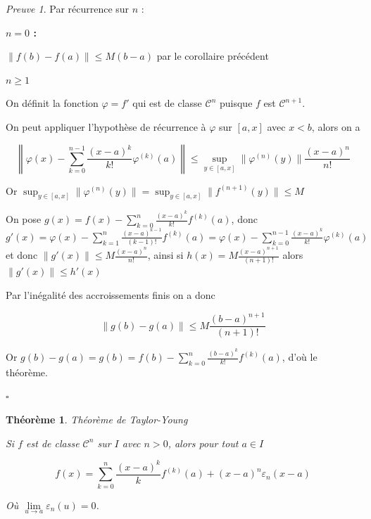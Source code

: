 \documentclass[]{article}
\newtheorem{mythm}{Théorème}
\theoremstyle{remark}
\newtheorem{myproof}{Preuve}
\theoremstyle{definition}
\newcommand{\cqfd}{
	\hfill$\square$
}
\newenvironment{proofpart}[1]{
	\noindent
	{\textbf{\boldmath #1}}
}{
	\checkmark
}
\begin{document}
\begin{myproof}
	Par récurrence sur $n$ :
	
	\begin{proofpart}{$n = 0$ :}
		$\|f(b) - f(a)\| \leqslant M (b - a)$ par le corollaire précédent
	\end{proofpart}
	
	\begin{proofpart}{$ n \geqslant 1$}
		On définit la fonction $\varphi = f'$ qui est de classe $\mathcal{C}^n$ puisque $f$ est $\mathcal{C}^{n+1}$.
		
		On peut appliquer l'hypothèse de récurrence à $\varphi$ sur $[a, x]$ avec $x < b$, alors on a
		
		$$\left\|\varphi(x) - \sum_{k = 0}^{n - 1} \frac{(x - a)^k}{k!} \varphi^{(k)}(a)\right\| \leqslant \sup_{y \in [a, x]} \|\varphi^{(n)}(y)\| \frac{(x-a)^n}{n!}$$
		
		Or $\displaystyle \sup_{y \in [a, x]} \|\varphi^{(n)}(y)\| = \sup_{y \in [a, x]} \|f^{(n+1)}(y)\| \leqslant M$
		
		On pose $g(x) = f(x) - \sum_{k = 0}^{n} \frac{(x-a)^k}{k!}f^{(k)}(a)$, donc $g'(x) = \varphi(x) - \sum_{k = 1}^{n} \frac{(x-a)^{k-1}}{(k-1)!}f^{(k)}(a) = \varphi(x) - \sum_{k = 0}^{n-1} \frac{(x-a)^k}{k!}\varphi^{(k)}(a)$ et donc $\|g'(x)\| \leqslant M \frac{(x-a)^n}{n!}$, ainsi si $h(x)= M \frac{(x-a)^{n+1}}{(n+1)!}$ alors $\|g'(x)\| \leqslant h'(x)$
		
		Par l'inégalité des accroissements finis on a donc
		
		$$\|g(b) - g(a)\| \leqslant M \frac{(b-a)^{n+1}}{(n+1)!}$$
		
		Or $\displaystyle g(b) - g(a) = g(b) = f(b) - \sum_{k= 0}^{n} \frac{(b-a)^k}{k!} f^{(k)}(a)$, d'où le théorème.		
	\end{proofpart}
	
	\cqfd
\end{myproof}

\begin{mythm}
	Théorème de Taylor-Young
	
	Si $f$ est de classe $\mathcal{C}^n$ sur $I$ avec $n > 0$, alors pour tout $a \in I$
	
	$$f(x) = \sum_{k = 0}^{n} \frac{(x-a)^k}{k} f^{(k)}(a) + (x-a)^n \varepsilon_n(x- a)$$
	
	Où $\lim\limits_{u \to a} \varepsilon_n(u) = 0$.
\end{mythm}
\end{document}
